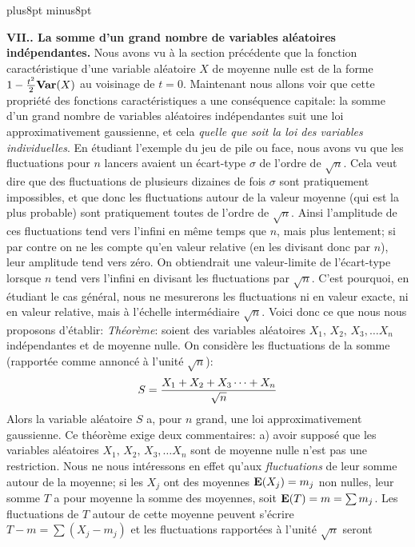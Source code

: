 \vskip12pt plus8pt minus8pt

{\bf VII.. La somme d'un grand nombre de variables al\'eatoires
ind\'ependantes.} 
\medskip
Nous avons vu \`a la section pr\'ec\'edente que la fonction caract\'eristique
d'une variable al\'eatoire $X$ de moyenne nulle est de la forme $1 -{t^2 
\over 2}  {\bf Var} (X)$ au voisinage de $t = 0$. Maintenant nous allons 
voir que cette propri\'et\'e des fonctions caract\'eristiques a une
cons\'equence capitale: la somme d'un grand nombre de variables
al\'eatoires ind\'ependantes suit une loi approximativement gaussienne, 
et cela {\it quelle que soit la loi des variables individuelles}. 
\medskip
En \'etudiant l'exemple du jeu de pile ou face, nous avons vu que les
fluctuations pour $n$ lancers avaient un \'ecart-type $\sigma$ de l'ordre 
de $\sqrt{n}$. Cela veut dire que des fluctuations de plusieurs dizaines de
fois $\sigma$ sont pratiquement impossibles, et que donc les fluctuations
autour de la valeur moyenne (qui est la plus probable) sont pratiquement
toutes de l'ordre de $\sqrt{n}$. Ainsi l'amplitude de ces fluctuations tend
vers l'infini en m\^eme temps que $n$, mais plus lentement; si par contre
on ne les compte qu'en valeur relative (en les divisant donc par $n$), leur
amplitude tend vers z\'ero. On obtiendrait une valeur-limite de 
l'\'ecart-type lorsque $n$ tend vers l'infini en divisant les fluctuations 
par $\sqrt{n}$. C'est pourquoi, en \'etudiant le cas g\'en\'eral, nous ne
mesurerons les fluctuations ni en valeur exacte, ni en valeur relative, 
mais \`a l'\'echelle interm\'ediaire $\sqrt{n}$.
\medskip
Voici donc ce que nous nous proposons d'\'etablir:
\medskip
{\it Th\'eor\`eme}: soient des variables al\'eatoires 
$X_1,\,  X_2,\, X_3,
\ldots X_n$ ind\'e\-pen\-dantes et de
moyenne nulle. 
On consid\`ere les fluctuations de la somme
(rapport\'ee comme annonc\'e \`a l'unit\'e $\sqrt{n}$): 
$$S = {X_1 + X_2 + X_3 \cdots + X_n \over \sqrt{n}}$$
Alors la variable al\'eatoire $S$ a, pour $n$ grand, une loi
approximativement gaussienne.
\medskip
Ce th\'eor\`eme exige deux commentaires:
\smallskip
a) avoir suppos\'e que les variables al\'eatoires $X_1,\,  X_2,\, X_3,
\ldots X_n$ sont de moyenne nulle n'est pas une restriction. Nous ne 
nous int\'eressons en effet qu'aux {\it fluctuations} de leur somme
autour de  la moyenne; si les $X_j$ ont des moyennes ${\bf E}(X_j) = 
m_j$ non nulles, leur somme $T$ a pour moyenne la somme des moyennes,
soit ${\bf E}(T) = m = \sum m_j$. Les fluctuations de $T$ autour de cette
moyenne peuvent s'\'ecrire $T - m = \sum (X_j - m_j)$ et les
fluctuations rapport\'ees \`a l'unit\'e $\sqrt{n}$ seront
